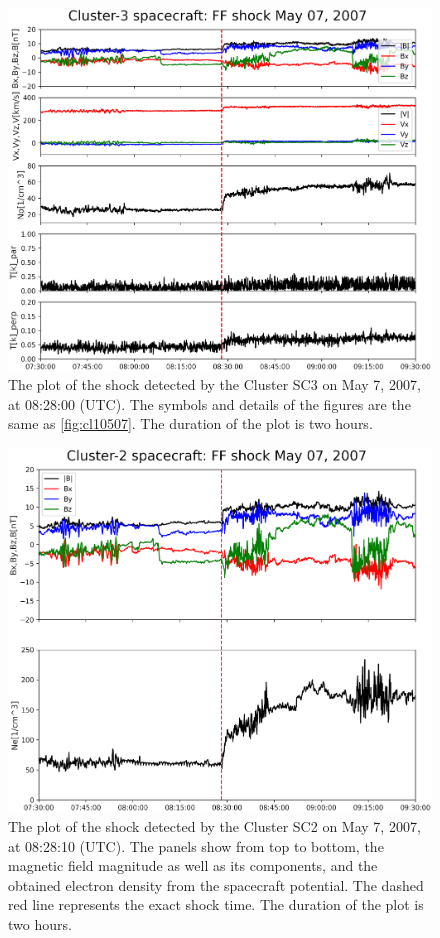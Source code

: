 \documentclass[draft]{agujournal2019}
\begin{document}
\pagebreak

\begin{figure}[!t]
\centering
\includegraphics[width=1.\textwidth]{jgr-2023-ipshocks-f05.eps}
\caption{The plot of the shock detected by the Cluster SC3 on May 7, 2007, at 08:28:00 (UTC). The symbols and details of the figures are the same as \ref{fig:cl10507}. The duration of the plot is two hours.}
\label{fig:cl30507}
\end{figure}

\pagebreak

\begin{figure}[!t]
\centering
\includegraphics[width=1.\textwidth]{jgr-2023-ipshocks-f06.eps}
\caption{The plot of the shock detected by the Cluster SC2 on May 7, 2007, at 08:28:10 (UTC). The panels show from top to bottom, the magnetic field magnitude as well as its components, and the obtained electron density from the spacecraft potential. The dashed red line represents the exact shock time. The duration of the plot is two hours.}
\label{fig:cl20507}
\end{figure}
\end{document}
